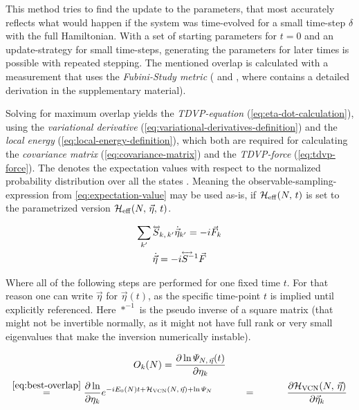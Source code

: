 This method tries to find the update to the parameters, that most accurately reflects what would happen if the system was time-evolved for a small time-step $\delta$ with the full Hamiltonian.
With a set of starting parameters for $t=0$ and an update-strategy for small time-steps, generating the parameters for later times is possible with repeated stepping.
The mentioned overlap is calculated with a measurement that uses the \emph{Fubini-Study metric} (\cite{variationalClassicalNetworksPaper} and \cite{probabilitySamplingRequirementVCN}, where \cite{probabilitySamplingRequirementVCN} contains a detailed derivation in the supplementary material).

Solving for maximum overlap yields the \emph{TDVP-equation} (\autoref{eq:eta-dot-calculation}), using the \emph{variational derivative} (\autoref{eq:variational-derivatives-definition}) and the \emph{local energy} (\autoref{eq:local-energy-definition}), which both are required for calculating the \emph{covariance matrix} (\autoref{eq:covariance-matrix}) and the \emph{TDVP-force} (\autoref{eq:tdvp-force}).
The \etaExpectationVal{\ast} denotes the expectation values with respect to the normalized probability distribution over all the states  \cite{probabilitySamplingRequirementVCN}.
Meaning the observable-sampling-expression from \autoref{eq:expectation-value} may be used as-is, if $\HeffOft$ is set to the parametrized version $\HeffOft[N,\,\vec{\eta}]$.

\begin{equation}
    \label{eq:eta-dot-calculation}
    \begin{gathered}
        \lsum[k'] \matvec{S}_{k,\, k'} \dot{\vec{\eta}}_{k'} = -i \vec{F}_k\\
        \dot{\vec{\eta}} = -i {\matvec{S^{-1}}} \vec{F}
    \end{gathered}
\end{equation}

Where all of the following steps are performed for one fixed time $t$.
For that reason one can write $\vec{\eta}$ for $\vec{\eta}(t)$, as the specific time-point $t$ is implied until explicitly referenced.
Here $\ast^{-1}$ is the pseudo inverse of a square matrix (that might not be invertible normally, as it might not have full rank or very small eigenvalues that make the inversion numerically instable).

\begin{equation}
    \label{eq:variational-derivatives-definition}
    \begin{gathered}
        O_{k}(N) = \frac{\partial \ln \psiEta{N,\,\vec{\eta}}{t}}{\partial \eta_k}\\
        \stackrel{\ref{eq:best-overlap}}{=} \frac{\partial \ln }{\partial \eta_k} e^{-i E_0(N) t + \Hvcn{\vec{\eta}} + \ln \psiN} 
        \stackrel{\phantom{\ref{eq:best-overlap}}}{=} 
        \frac{\partial \Hvcn{\vec{\eta}} }{\partial \vec{\eta}_k} 
    \end{gathered}
\end{equation}

